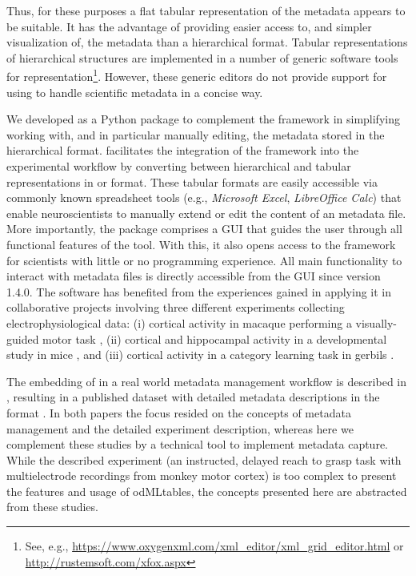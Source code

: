 Thus, for these purposes a flat tabular representation of the metadata appears to be suitable. It has the advantage of providing easier access to, and simpler visualization of, the metadata than a hierarchical format. Tabular representations of hierarchical structures are implemented in a number of generic software tools for  representation\footnote{See, e.g., \url{https://www.oxygenxml.com/xml\_editor/xml\_grid\_editor.html} or \url{http://rustemsoft.com/xfox.aspx}}. However, these generic  editors do not provide support for using  to handle scientific metadata in a concise way.

We developed  as a Python package to complement the  framework in simplifying working with, and in particular manually editing, the metadata stored in the hierarchical  format.  facilitates the integration of the  framework into the experimental workflow by converting between hierarchical  and tabular representations in  or  format. These tabular formats are easily accessible via commonly known spreadsheet tools (e.g., \textit{Microsoft Excel}, \textit{LibreOffice Calc}) that enable neuroscientists to manually extend or edit the content of an  metadata file. More importantly, the  package comprises a GUI that guides the user through all functional features of the tool. With this, it also opens access to the  framework for scientists with little or no programming experience. All main functionality to interact with metadata files is directly accessible from the  GUI since version 1.4.0. The software has benefited from the experiences gained in applying it in collaborative projects involving three different experiments collecting electrophysiological data: (i) cortical activity in macaque performing a visually-guided motor task \citep[e.g.,][]{Denker_2018,Brochier_2018}, (ii) cortical and hippocampal activity in a developmental study in mice \citep[e.g.,][]{Bitzenhofer_2017}, and (iii) cortical activity in a category learning task in gerbils \citep[e.g.,][]{Ohl_2001}.

The embedding of  in a real world metadata management workflow is described in \cite{Zehl_2016}, resulting in a published dataset with detailed metadata descriptions in the  format  \citep{Brochier_2018}. In both papers the focus resided on the concepts of metadata management and the detailed experiment description, whereas here we complement these studies by a technical tool to implement metadata capture. While the described experiment (an instructed, delayed reach to grasp task with multielectrode recordings from monkey motor cortex) is too complex to present the features and usage of odMLtables, the concepts presented here are abstracted from these studies.

